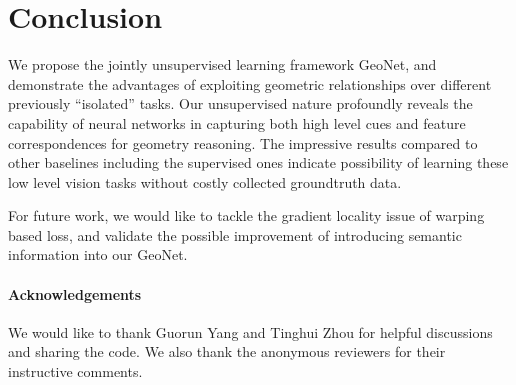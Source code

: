 \documentclass[10pt,twocolumn,letterpaper]{article}
\begin{document}
\section{Conclusion}
\label{sec:conclu}
We propose the jointly unsupervised learning framework GeoNet, and demonstrate the advantages of exploiting geometric relationships over different previously ``isolated'' tasks. Our unsupervised nature profoundly reveals the capability of neural networks in capturing both high level cues and feature correspondences for geometry reasoning. The impressive results compared to other baselines including the supervised ones indicate possibility of learning these low level vision tasks without costly collected groundtruth data.

For future work, we would like to tackle the gradient locality issue of warping based loss, and validate the possible improvement of introducing semantic information into our GeoNet.

\paragraph{Acknowledgements} We would like to thank Guorun Yang and Tinghui Zhou for helpful discussions and sharing the code. We also thank the anonymous reviewers for their instructive comments.
\vspace{-1ex}

{\small


}
\end{document}
